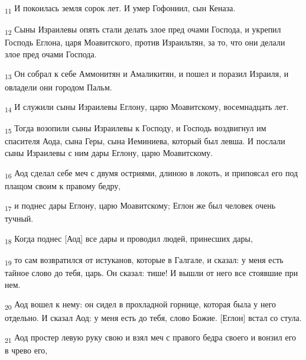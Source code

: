 \begin{tcolorbox}
\textsubscript{11} И покоилась земля сорок лет. И умер Гофониил, сын Кеназа.
\end{tcolorbox}
\begin{tcolorbox}
\textsubscript{12} Сыны Израилевы опять стали делать злое пред очами Господа, и укрепил Господь Еглона, царя Моавитского, против Израильтян, за то, что они делали злое пред очами Господа.
\end{tcolorbox}
\begin{tcolorbox}
\textsubscript{13} Он собрал к себе Аммонитян и Амаликитян, и пошел и поразил Израиля, и овладели они городом Пальм.
\end{tcolorbox}
\begin{tcolorbox}
\textsubscript{14} И служили сыны Израилевы Еглону, царю Моавитскому, восемнадцать лет.
\end{tcolorbox}
\begin{tcolorbox}
\textsubscript{15} Тогда возопили сыны Израилевы к Господу, и Господь воздвигнул им спасителя Аода, сына Геры, сына Иеминиева, который был левша. И послали сыны Израилевы с ним дары Еглону, царю Моавитскому.
\end{tcolorbox}
\begin{tcolorbox}
\textsubscript{16} Аод сделал себе меч с двумя остриями, длиною в локоть, и припоясал его под плащом своим к правому бедру,
\end{tcolorbox}
\begin{tcolorbox}
\textsubscript{17} и поднес дары Еглону, царю Моавитскому; Еглон же был человек очень тучный.
\end{tcolorbox}
\begin{tcolorbox}
\textsubscript{18} Когда поднес [Аод] все дары и проводил людей, принесших дары,
\end{tcolorbox}
\begin{tcolorbox}
\textsubscript{19} то сам возвратился от истуканов, которые в Галгале, и сказал: у меня есть тайное слово до тебя, царь. Он сказал: тише! И вышли от него все стоявшие при нем.
\end{tcolorbox}
\begin{tcolorbox}
\textsubscript{20} Аод вошел к нему: он сидел в прохладной горнице, которая была у него отдельно. И сказал Аод: у меня есть до тебя, слово Божие. [Еглон] встал со стула.
\end{tcolorbox}
\begin{tcolorbox}
\textsubscript{21} Аод простер левую руку свою и взял меч с правого бедра своего и вонзил его в чрево его,
\end{tcolorbox}
